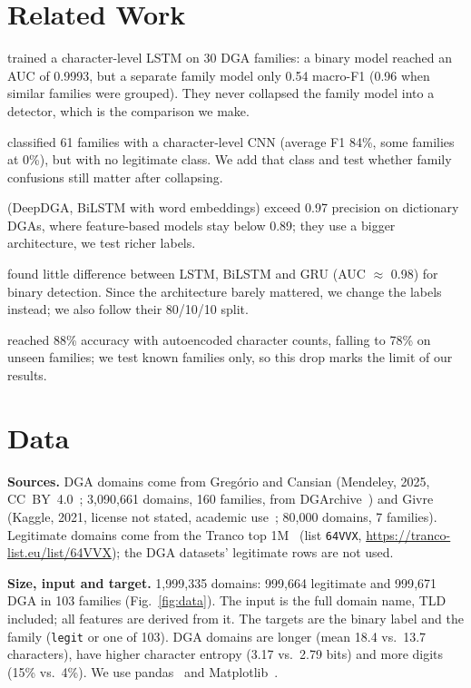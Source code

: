 \documentclass[11pt]{article}
\begin{document}
\section{Related Work}
\citet{woodbridge2016lstm} trained a character-level LSTM on 30 DGA families: a
binary model reached an AUC of 0.9993, but a separate family model only 0.54
macro-F1 (0.96 when similar families were grouped). They never collapsed the
family model into a detector, which is the comparison we make.

\citet{gregorio2024incremental} classified 61 families with a character-level CNN
(average F1 84\%, some families at 0\%), but with no legitimate class. We add
that class and test whether family confusions still matter after collapsing.

\citet{torrealba2025deepdga} (DeepDGA, BiLSTM with word embeddings) exceed 0.97
precision on dictionary DGAs, where feature-based models stay below 0.89; they
use a bigger architecture, we test richer labels.

\citet{shahzad2021dga} found little difference between LSTM, BiLSTM and GRU
(AUC $\approx$ 0.98) for binary detection. Since the architecture barely
mattered, we change the labels instead; we also follow their 80/10/10 split.

\citet{dahal2019autoencoded} reached 88\% accuracy with autoencoded character
counts, falling to 78\% on unseen families; we test known families only, so this
drop marks the limit of our results.

\section{Data}
\textbf{Sources.} DGA domains come from Greg{\'o}rio and Cansian (Mendeley, 2025,
CC~BY~4.0~\cite{gregorio2025dataset}; 3{,}090{,}661 domains, 160 families, from
DGArchive~\cite{plohmann2016dgarchive}) and Givre (Kaggle, 2021, license not
stated, academic use~\cite{givre2021kaggle}; 80{,}000 domains, 7 families).
Legitimate domains come from the Tranco top 1M~\cite{lepochat2019tranco} (list
\texttt{64VVX}, \url{https://tranco-list.eu/list/64VVX}); the DGA datasets'
legitimate rows are not used.

\textbf{Size, input and target.} 1{,}999{,}335 domains: 999{,}664 legitimate and
999{,}671 DGA in 103 families (Fig.~\ref{fig:data}). The input is the full domain
name, TLD included; all features are derived from it. The targets are the binary
label and the family (\texttt{legit} or one of 103). DGA domains are longer (mean
18.4 vs.\ 13.7 characters), have higher character entropy (3.17 vs.\ 2.79 bits)
and more digits (15\% vs.\ 4\%). We use pandas~\cite{mckinney2010pandas} and
Matplotlib~\cite{hunter2007matplotlib}.
\end{document}
